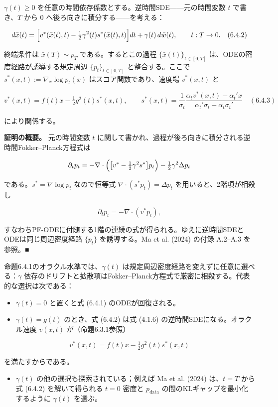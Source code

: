 \begin{propositionbox}[命題 6.4.1（逆時間SDEは補間と同じ周辺を生成する）]
$\gamma(t)\ge 0$ を任意の時間依存係数とする。逆時間SDE——元の時間変数 $t$ で書き、$T$ から $0$ へ後ろ向きに積分する——を考える：

\[
d\bar{x}(t)=\Bigl[v^*(\bar{x}(t),t)-\tfrac{1}{2}\gamma^2(t)s^*(\bar{x}(t),t)\Bigr]dt+\gamma(t)\,d\bar{w}(t),\qquad t:T\to 0. \quad (6.4.2)
\]

終端条件は $\bar{x}(T)\sim p_T$ である。するとこの過程 $\{\bar{x}(t)\}_{t\in[0,T]}$ は、ODEの密度経路が誘導する規定周辺 $\{p_t\}_{t\in[0,T]}$ と整合する。ここで $s^*(x,t):=\nabla_x\log p_t(x)$ はスコア関数であり、速度場 $v^*(x,t)$ と

\[
v^*(x,t)=f(t)x-\tfrac{1}{2}g^2(t)s^*(x,t),\qquad
s^*(x,t)=\frac{1}{\sigma_t}\frac{\alpha_t v^*(x,t)-\alpha_t'x}{\alpha_t'\sigma_t-\alpha_t\sigma_t'} \quad (6.4.3)
\]

により関係する。
\end{propositionbox}


\textbf{証明の概要。} 元の時間変数 $t$ に関して書かれ、過程が後ろ向きに積分される逆時間Fokker–Planck方程式は

\[
\partial_t p_t=-\nabla\cdot\Bigl(\bigl[v^*-\tfrac{1}{2}\gamma^2 s^*\bigr]p_t\Bigr)-\tfrac{1}{2}\gamma^2\Delta p_t
\]


である。$s^*=\nabla\log p_t$ なので恒等式 $\nabla\cdot(s^*p_t)=\Delta p_t$ を用いると、2階項が相殺し

\[
\partial_t p_t=-\nabla\cdot(v^* p_t),
\]


すなわちPF-ODEに付随する1階の連続の式が得られる。ゆえに逆時間SDEとODEは同じ周辺密度経路 $\{p_t\}$ を誘導する。Ma et al. (2024) の付録 A.2–A.3 を参照。■

命題6.4.1のオラクル水準では、$\gamma(t)$ は規定周辺密度経路を変えずに任意に選べる：$\gamma$ 依存のドリフトと拡散項はFokker–Planck方程式で厳密に相殺する。代表的な選択は次である：

\begin{itemize}
\item $\gamma(t)=0$ と置くと式 (6.4.1) のODEが回復される。
\item $\gamma(t)=g(t)$ のとき、式 (6.4.2) は式 (4.1.6) の逆時間SDEになる。オラクル速度 $v(x,t)$ が（命題6.3.1参照）
\end{itemize}

\[
v^*(x,t)=f(t)x-\tfrac{1}{2}g^2(t)s^*(x,t)
\]

  を満たすからである。
\begin{itemize}
\item $\gamma(t)$ の他の選択も探索されている；例えば Ma et al. (2024) は、$t=T$ から式 (6.4.2) を解いて得られる $t=0$ 密度と $p_{\mathrm{data}}$ の間のKLギャップを最小化するように $\gamma(t)$ を選ぶ。
\end{itemize}


